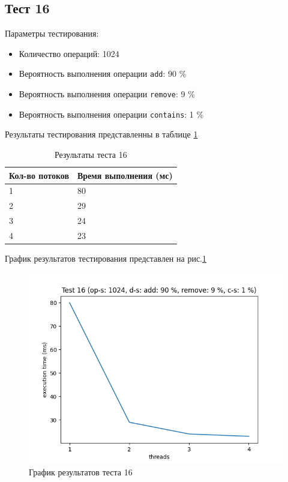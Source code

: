 \subsection*{Тест 16}

Параметры тестирования:

\begin{itemize}
    \item Количество операций: 1024
    \item Вероятность выполнения операции \verb|add|: 90 \%
    \item Вероятность выполнения операции \verb|remove|: 9 \%
    \item Вероятность выполнения операции \verb|contains|: 1 \%
\end{itemize}

Результаты тестирования представленны в таблице \ref{tab:results16}


\begin{table}[H]
    \centering
    \begin{tabular}{|l|l|}
        \hline
        Кол-во потоков & Время выполнения (мс) \\
        \hline
        1 & 80 \\
        \hline
        2 & 29 \\
        \hline
        3 & 24 \\
        \hline
        4 & 23 \\
        \hline
    \end{tabular}
    \caption{Результаты теста 16}
    \label{tab:results16}
\end{table}
        

График результатов тестирования представлен на рис.\ref{fig:plot16}

\begin{figure}[H]
    \centering
    \includegraphics[width=0.7\linewidth]{photo/plot16}
    \caption{График результатов теста 16}
    \label{fig:plot16}
\end{figure}

